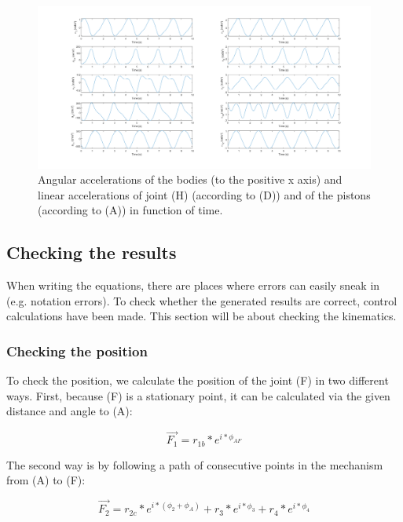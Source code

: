 \documentclass[a4paper]{article}
\begin{document}
\begin{figure}[h]
	\centering
	
	\includegraphics[width = \textwidth]{kinacc.png}
	
	\caption{Angular accelerations of the bodies (to the positive x axis) and linear accelerations of joint (H) (according to (D)) and of the pistons (according to (A)) in function of time.}
	\label{fig:kinacc}
	
\end{figure}


\subsection{Checking the results}

When writing the equations, there are places where errors can easily sneak in (e.g. notation errors). To check whether the generated results are correct, control calculations have been made. This section will be about checking the kinematics.

\subsubsection{Checking the position}

To check the position, we calculate the position of the joint (F) in two different ways. First, because (F) is a stationary point, it can be calculated via the given distance and angle to (A):

\begin{equation}
	\vec{F_1} = r_{1b}*e^{i*\phi_{AF}}
\end{equation}

The second way is by following a path of consecutive points in the mechanism from (A) to (F):

\begin{equation}
	\vec{F_2} = r_{2c}*e^{i*(\phi_2 + \phi_A)} + r_3*e^{i*\phi_3} + r_4*e^{i*\phi_4}
\end{equation}
\end{document}
